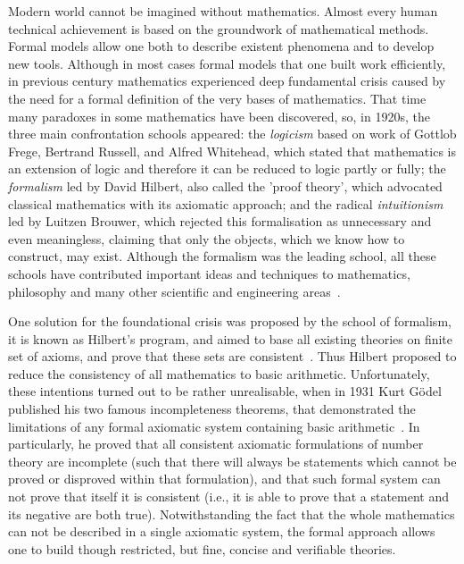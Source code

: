 \documentclass[article]{aaltoseries}
\begin{document}
Modern world cannot be imagined without mathematics. Almost every human technical achievement is based on the groundwork of mathematical methods. Formal models allow one both to describe existent phenomena and to develop new tools.
Although in most cases formal models that one built work efficiently, in previous century mathematics experienced deep fundamental crisis caused by the need for a formal definition of the very bases of mathematics. That time many paradoxes in some mathematics have been discovered, so, in 1920s, the three main confrontation schools appeared:
the \textit{logicism} based on work of Gottlob Frege, Bertrand Russell, and Alfred Whitehead, which stated that mathematics is an extension of logic and therefore it can be reduced to logic partly or fully;
the \textit{formalism} led by David Hilbert, also called the 'proof theory', which advocated classical mathematics with its axiomatic approach;
and the radical \textit{intuitionism} led by Luitzen Brouwer, which rejected this formalisation as unnecessary and even meaningless, claiming that only the objects, which we know how to construct, may exist.
Although the formalism was the leading school, all these schools have contributed important ideas and techniques to mathematics, philosophy and many other scientific and engineering areas~\cite{Fer08}.

One solution for the foundational crisis was proposed by the school of formalism, it is known as Hilbert's program, and aimed to base all existing theories on finite set of axioms, and prove that these sets are consistent~\cite{Zac06}. Thus Hilbert proposed to reduce the consistency of all mathematics to basic arithmetic. 
Unfortunately, these intentions turned out to be rather unrealisable, when in 1931 Kurt Gödel published his two famous incompleteness theorems, that demonstrated the limitations of any formal axiomatic system containing basic arithmetic~\cite{Raa15}. In particularly, he proved that all consistent axiomatic formulations of number theory are incomplete (such that there will always be statements which cannot be proved or disproved within that formulation), and that such formal system can not prove that itself it is consistent (i.e., it is able to prove that a statement and its negative are both true).
Notwithstanding the fact that the whole mathematics can not be described in a single axiomatic system, the formal approach allows one to build though restricted, but fine, concise and verifiable theories.

\end{document}

